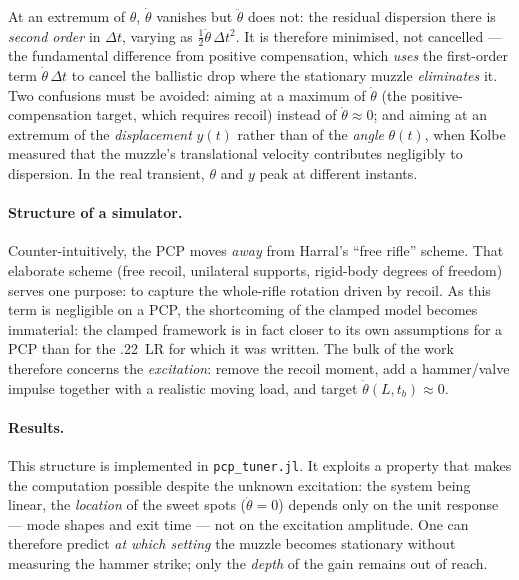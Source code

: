 \documentclass[12pt,a4paper]{article}
\begin{document}
	At an extremum of $\theta$, $\dot\theta$ vanishes but $\ddot\theta$ does not: the residual dispersion there is \emph{second order} in $\Delta t$, varying as $\tfrac{1}{2}\ddot\theta\,\Delta t^2$. It is therefore minimised, not cancelled --- the fundamental difference from positive compensation, which \emph{uses} the first-order term $\dot\theta\,\Delta t$ to cancel the ballistic drop where the stationary muzzle \emph{eliminates} it. Two confusions must be avoided: aiming at a maximum of $\dot\theta$ (the positive-compensation target, which requires recoil) instead of $\dot\theta \approx 0$; and aiming at an extremum of the \emph{displacement} $y(t)$ rather than of the \emph{angle} $\theta(t)$, when Kolbe measured that the muzzle's translational velocity contributes negligibly to dispersion. In the real transient, $\theta$ and $y$ peak at different instants.

	\paragraph{Structure of a simulator.} Counter-intuitively, the PCP moves \emph{away} from Harral's ``free rifle'' scheme. That elaborate scheme (free recoil, unilateral supports, rigid-body degrees of freedom) serves one purpose: to capture the whole-rifle rotation driven by recoil. As this term is negligible on a PCP, the shortcoming of the clamped model becomes immaterial: the clamped framework is in fact closer to its own assumptions for a PCP than for the .22~LR for which it was written. The bulk of the work therefore concerns the \emph{excitation}: remove the recoil moment, add a hammer/valve impulse together with a realistic moving load, and target $\dot\theta(L,t_b) \approx 0$.

	\paragraph{Results.} This structure is implemented in \texttt{pcp\_tuner.jl}. It exploits a property that makes the computation possible despite the unknown excitation: the system being linear, the \emph{location} of the sweet spots ($\dot\theta = 0$) depends only on the unit response --- mode shapes and exit time --- not on the excitation amplitude. One can therefore predict \emph{at which setting} the muzzle becomes stationary without measuring the hammer strike; only the \emph{depth} of the gain remains out of reach.
\end{document}
